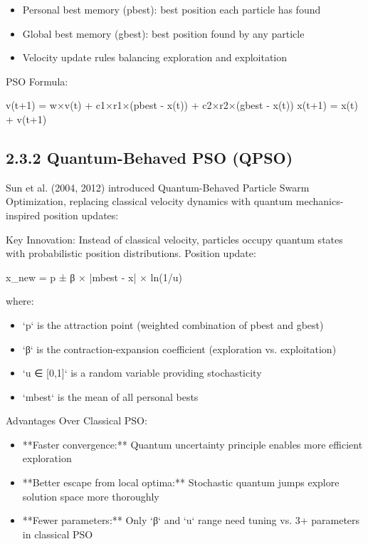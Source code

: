 \begin{itemize}
  \item Personal best memory (pbest): best position each particle has found
  \item Global best memory (gbest): best position found by any particle
  \item Velocity update rules balancing exploration and exploitation
\end{itemize}

PSO Formula:

v(t+1) = w×v(t) + c1×r1×(pbest - x(t)) + c2×r2×(gbest - x(t))
x(t+1) = x(t) + v(t+1)


\subsection{2.3.2 Quantum-Behaved PSO (QPSO)}
Sun et al. (2004, 2012) introduced Quantum-Behaved Particle Swarm Optimization, replacing classical velocity dynamics with quantum mechanics-inspired position updates:

Key Innovation: Instead of classical velocity, particles occupy quantum states with probabilistic position distributions. Position update:

x\_new = p ± β × |mbest - x| × ln(1/u)

where:

\begin{itemize}
  \item `p` is the attraction point (weighted combination of pbest and gbest)
  \item `β` is the contraction-expansion coefficient (exploration vs. exploitation)
  \item `u ∈ [0,1]` is a random variable providing stochasticity
  \item `mbest` is the mean of all personal bests
\end{itemize}

Advantages Over Classical PSO:

\begin{itemize}
  \item **Faster convergence:** Quantum uncertainty principle enables more efficient exploration
  \item **Better escape from local optima:** Stochastic quantum jumps explore solution space more thoroughly
  \item **Fewer parameters:** Only `β` and `u` range need tuning vs. 3+ parameters in classical PSO
\end{itemize}


